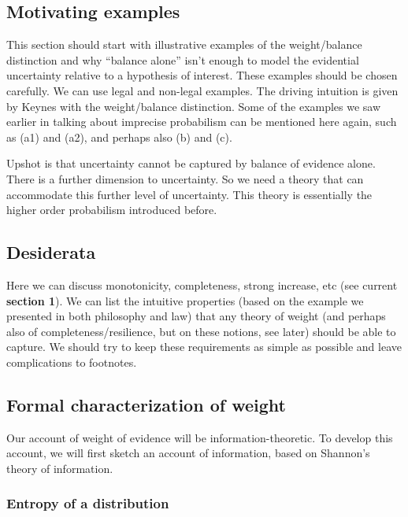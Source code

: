 \documentclass[
  10pt,
  dvipsnames,enabledeprecatedfontcommands]{scrartcl}
\begin{document}
\hypertarget{motivating-examples}{%
\subsection{Motivating examples}\label{motivating-examples}}

This section should start with illustrative examples of the
weight/balance distinction and why ``balance alone'' isn't enough to
model the evidential uncertainty relative to a hypothesis of interest.
These examples should be chosen carefully. We can use legal and
non-legal examples. The driving intuition is given by Keynes with the
weight/balance distinction. Some of the examples we saw earlier in
talking about imprecise probabilism can be mentioned here again, such as
(a1) and (a2), and perhaps also (b) and (c).

Upshot is that uncertainty cannot be captured by balance of evidence
alone. There is a further dimension to uncertainty. So we need a theory
that can accommodate this further level of uncertainty. This theory is
essentially the higher order probabilism introduced before.

\hypertarget{desiderata}{%
\subsection{Desiderata}\label{desiderata}}

Here we can discuss monotonicity, completeness, strong increase, etc
(see current \textbf{section 1}). We can list the intuitive properties
(based on the example we presented in both philosophy and law) that any
theory of weight (and perhaps also of completeness/resilience, but on
these notions, see later) should be able to capture. We should try to
keep these requirements as simple as possible and leave complications to
footnotes.

\hypertarget{formal-characterization-of-weight}{%
\subsection{Formal characterization of
weight}\label{formal-characterization-of-weight}}

Our account of weight of evidence will be information-theoretic. To
develop this account, we will first sketch an account of information,
based on Shannon's theory of information.

\hypertarget{entropy-of-a-distribution}{%
\subsubsection{Entropy of a
distribution}\label{entropy-of-a-distribution}}
\end{document}
